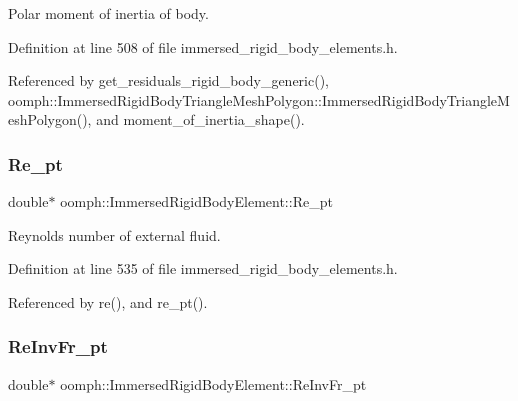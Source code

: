 Polar moment of inertia of body. 



Definition at line 508 of file immersed\+\_\+rigid\+\_\+body\+\_\+elements.\+h.



Referenced by get\+\_\+residuals\+\_\+rigid\+\_\+body\+\_\+generic(), oomph\+::\+Immersed\+Rigid\+Body\+Triangle\+Mesh\+Polygon\+::\+Immersed\+Rigid\+Body\+Triangle\+Mesh\+Polygon(), and moment\+\_\+of\+\_\+inertia\+\_\+shape().

\mbox{\label{classoomph_1_1ImmersedRigidBodyElement_a90b0f294088777736260ffc4922af431}} 
\subsubsection{\texorpdfstring{Re\+\_\+pt}{Re\_pt}}
{\footnotesize\ttfamily double$\ast$ oomph\+::\+Immersed\+Rigid\+Body\+Element\+::\+Re\+\_\+pt\hspace{0.3cm}{\ttfamily [private]}}



Reynolds number of external fluid. 



Definition at line 535 of file immersed\+\_\+rigid\+\_\+body\+\_\+elements.\+h.



Referenced by re(), and re\+\_\+pt().

\mbox{\label{classoomph_1_1ImmersedRigidBodyElement_a592e3846e9894c23cb6bb232d342eb20}} 
\subsubsection{\texorpdfstring{Re\+Inv\+Fr\+\_\+pt}{ReInvFr\_pt}}
{\footnotesize\ttfamily double$\ast$ oomph\+::\+Immersed\+Rigid\+Body\+Element\+::\+Re\+Inv\+Fr\+\_\+pt\hspace{0.3cm}{\ttfamily [private]}}



